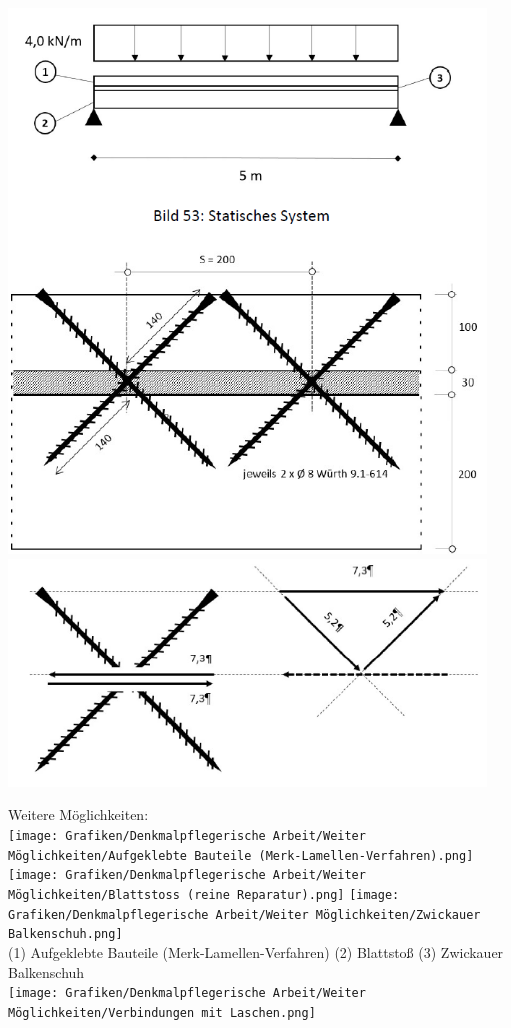 \documentclass[fleqn,twoside]{article}
\begin{document}
        \begin{minipage}{0.45\textwidth}
            \includegraphics[width=0.95\textwidth]{Grafiken/Denkmalpflegerische Arbeit/Reparatur von Deckenbalken Statik 1.png}\\
            \includegraphics[width=0.95\textwidth]{Grafiken/Denkmalpflegerische Arbeit/Reparatur von Deckenbalken Statik 3.png}
        \end{minipage}

        Weitere Möglichkeiten:\\
        \texttt{[image: Grafiken/Denkmalpflegerische Arbeit/Weiter Möglichkeiten/Aufgeklebte Bauteile (Merk-Lamellen-Verfahren).png]}
        \texttt{[image: Grafiken/Denkmalpflegerische Arbeit/Weiter Möglichkeiten/Blattstoss (reine Reparatur).png]}
        \texttt{[image: Grafiken/Denkmalpflegerische Arbeit/Weiter Möglichkeiten/Zwickauer Balkenschuh.png]}\\
        (1) Aufgeklebte Bauteile (Merk-Lamellen-Verfahren) (2) Blattstoß (3) Zwickauer Balkenschuh\\
        \texttt{[image: Grafiken/Denkmalpflegerische Arbeit/Weiter Möglichkeiten/Verbindungen mit Laschen.png]}\\
\end{document}
